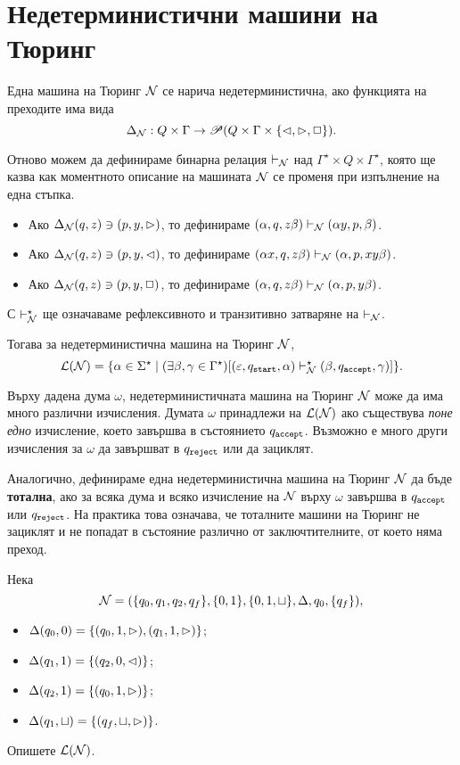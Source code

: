 \section{Недетерминистични машини на Тюринг}

Една машина на Тюринг $\mathcal{N}$ се нарича недетерминистична, ако функцията на преходите има вида
\[\Delta_{\mathcal{N}}: Q\times \Gamma \to \mathscr{P}(Q \times \Gamma\times \{\lhd,\rhd,\Box\}). \]

Отново можем да дефинираме бинарна релация $\vdash_{\mathcal{N}}$ над $\Gamma^\star \times Q \times \Gamma^\star$,
която ще казва как моментното описание на машината $\mathcal{N}$ се променя при изпълнение на една стъпка.
\begin{itemize}
\item
  Ако $\Delta_{\mathcal{N}}(q,z) \ni (p,y,\rhd)$, то дефинираме $(\alpha, q, z\beta) \vdash_{\mathcal{N}} (\alpha y, p, \beta)$.
\item 
  Ако $\Delta_{\mathcal{N}}(q,z) \ni (p,y,\lhd)$, то дефинираме $(\alpha x, q, z\beta) \vdash_{\mathcal{N}} (\alpha , p, xy\beta)$.
\item 
  Ако $\Delta_{\mathcal{N}}(q,z) \ni (p,y,\Box)$, то дефинираме $(\alpha, q, z\beta) \vdash_{\mathcal{N}} (\alpha, p, y\beta)$.
\end{itemize}
С $\vdash^\star_{\mathcal{N}}$ ще означаваме рефлексивното и транзитивно затваряне на $\vdash_{\mathcal{N}}$.

Тогава за недетерминистична машина на Тюринг $\mathcal{N}$, 
\[\mathcal{L}(\mathcal{N}) = \{\alpha\in\Sigma^\star \mid (\exists \beta,\gamma \in \Gamma^\star)[(\varepsilon, q_{\texttt{start}}, \alpha) \vdash^\star_{\mathcal{N}} (\beta, q_{\texttt{accept}}, \gamma) ]\}.\]

\begin{remark}
  Върху дадена дума $\omega$, недетерминистичната машина на Тюринг $\mathcal{N}$ може да има много различни изчисления.
  Думата $\omega$ принадлежи на $\mathcal{L}(\mathcal{N})$ ако съществува {\em поне едно} изчисление, което завършва в състоянието $q_{\texttt{accept}}$.
  Възможно е много други изчисления за $\omega$ да завършват в $q_{\texttt{reject}}$ или да зациклят.
\end{remark}

Аналогично, дефинираме една недетерминистична машина на Тюринг $\mathcal{N}$ да бъде {\bf тотална}, ако за всяка дума и 
всяко изчисление на $\mathcal{N}$ върху $\omega$ завършва в $q_{\texttt{accept}}$ или $q_{\texttt{reject}}$.
На практика това означава, че тоталните машини на Тюринг не зациклят и не попадат в състояние различно от заключтителните, от което няма преход.

\begin{problem}
  Нека
  \[\mathcal{N} = (\{q_0,q_1,q_2,q_f\}, \{0,1\}, \{0,1,\sqcup\}, \Delta, q_0, \{q_f\}),\]
  \begin{itemize}
  \item 
    $\Delta(q_0,0) = \{(q_0,1,\rhd),(q_1,1,\rhd)\}$;
  \item
    $\Delta(q_1,1) = \{(q_2,0,\lhd)\}$;
  \item
    $\Delta(q_2,1) = \{(q_0,1,\rhd)\}$;
  \item
    $\Delta(q_1,\sqcup) = \{(q_f,\sqcup,\rhd)\}$.
  \end{itemize}
  Опишете $\mathcal{L}(\mathcal{N})$.
\end{problem}

